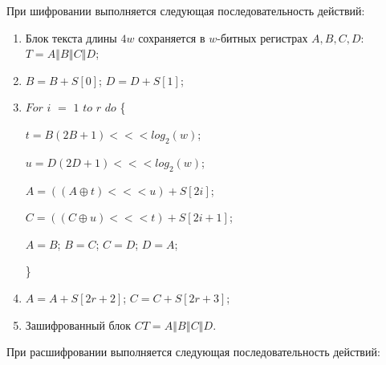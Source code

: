 \documentclass{./civarticle}
\begin{document}
При шифровании выполняется следующая последовательность действий:

\begin{enumerate}
    \item Блок текста длины $4w$ сохраняется в $w$-битных регистрах $A, B, C, D$: $T = A \mathbin\Vert B \mathbin\Vert C \mathbin\Vert D$;

    \item $B = B + S[0]$; $D = D + S[1]$;

    \item $For$ $i$ $=$ $1$ $to$ $r$ $do$ \{ 

    \hspace{0.5cm} $t = B(2B + 1) <<< log_2(w)$;
    
    \hspace{0.5cm} $u = D(2D + 1) <<< log_2(w)$;

    \hspace{0.5cm} $A = ((A \oplus t) <<< u) + S[2i]$;

    \hspace{0.5cm} $C = ((C \oplus u) <<< t) + S[2i + 1]$;

    \hspace{0.5cm} $A = B$; $B = C$; $C = D$; $D = A$;
    
\}

    \item $A = A + S[2r + 2]$; $C = C + S[2r + 3]$;

    \item Зашифрованный блок $CT = A \mathbin\Vert B \mathbin\Vert C \mathbin\Vert D$.
    
\end{enumerate}

При расшифровании выполняется следующая последовательность действий:
\end{document}
